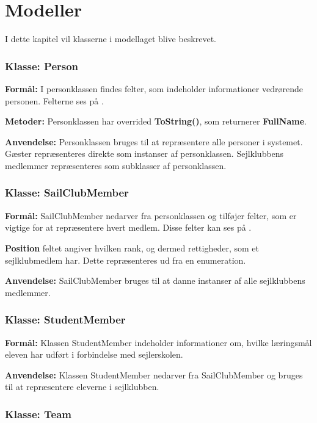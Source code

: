 \chapter{Modeller} \label{chap:klasser}

I dette kapitel vil klasserne i modellaget blive beskrevet.

\subsection{Klasse: Person}

\textbf{Formål:}
I personklassen findes felter, som indeholder informationer vedrørende personen. Felterne ses på .

\textbf{Metoder:}
Personklassen har overrided \textbf{ToString()}, som returnerer \textbf{FullName}.

\textbf{Anvendelse:}
Personklassen bruges til at repræsentere alle personer i systemet. 
Gæster repræsenteres direkte som instanser af personklassen. Sejlklubbens medlemmer repræsenteres som subklasser af personklassen. 

\subsection*{Klasse: SailClubMember}

\textbf{Formål:}
SailClubMember nedarver fra personklassen og tilføjer felter, som er vigtige for at repræsentere hvert medlem.
Disse felter kan ses på .

\textbf{Position} feltet angiver hvilken rank, og dermed rettigheder, som et sejlklubmedlem har. 
Dette repræsenteres ud fra en enumeration.

\textbf{Anvendelse:}
SailClubMember bruges til at danne instanser af alle sejlklubbens medlemmer. 

\subsection*{Klasse: StudentMember}
\textbf{Formål:}
Klassen StudentMember indeholder informationer om, hvilke læringsmål eleven har udført i forbindelse med sejlerskolen. 

\textbf{Anvendelse:}
Klassen StudentMember nedarver fra SailClubMember og bruges til at repræsentere eleverne i sejlklubben.

\subsection*{Klasse: Team}

